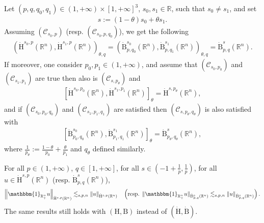 \documentclass[AHL,Unicode,longabstracts,published]{cedram}
\newcommand{\bbR}{\mathbb{R}}
\newcommand{\rmH}{\mathrm{H}}%
\newcommand{\rmB}{\mathrm{B}}
\newcommand{\clC}{\mathcal{C}}
\begin{document}
\begin{prop}\label{prop:InterpHomSpacesRn}
Let $(p,q,q_0,q_1)\in(1,+\infty)\times[1,+\infty]^3$, $s_0,s_1\in\bbR$, such that $s_0\neq s_1$, and set
\begin{align*}
s:= (1-\theta)s_0+ \theta s_1.
\end{align*}
Assuming $(\clC_{s_0,p})$ (resp. $(\clC_{s_0,p,q_0})$), we get the following
\begin{align}\label{eq:realInterpHomBspqRn}
\left(\dot{\rmH}^{s_0,p}(\bbR^n),\dot{\rmH}^{s_1,p}(\bbR^n)\right)_{\theta,q}= \left(\dot{\rmB}^{s_0}_{p,q_0}(\bbR^n),\dot{\rmB}^{s_1}_{p,q_1}(\bbR^n)\right)_{\theta,q}=\dot{\rmB}^{s}_{p,q}(\bbR^n).
\end{align}
If moreover, one consider $p_0,p_1\in(1,+\infty)$, and assume that $(\clC_{s_0,p_0})$ and $(\clC_{s_1,p_1})$ are true then also is $(\clC_{s,p_\theta})$ and
\begin{align}\label{eq:complexInterpHomHspRn}
\left[\dot{\rmH}^{s_0,p_0}(\bbR^n),\dot{\rmH}^{s_1,p_1}(\bbR^n)\right]_{\theta} = \dot{\rmH}^{s,p_\theta}(\bbR^n),
\end{align}
and if $(\clC_{s_0,p_0,q_0})$ and $(\clC_{s_1,p_1,q_1})$ are satisfied then $(\clC_{s,p_\theta,q_\theta})$ is also satisfied with
\begin{align}\label{eq:complexInterpHomBspqRn}
\left[\dot{\rmB}^{s_0}_{p_0,q_0}(\bbR^n),\dot{\rmB}^{s_1}_{p_1,q_1}(\bbR^n)\right]_{\theta} = \dot{\rmB}^{s}_{p_\theta,q_\theta}(\bbR^n),
\end{align}
where $\frac{1}{p_\theta}:=\frac{1-\theta}{p_0}+\frac{\theta}{p_1}$ and $q_\theta$ defined similarly.
\end{prop}


\begin{prop}\label{prop:SobolevMultiplier}
For all $p\in(1,+\infty)$, $q\in[1,+\infty]$, for all $s\in (-1+\frac{1}{p},\frac{1}{p})$, for all $u\in\dot{\rmH}^{s,p}(\bbR^n)$ (resp. $\dot{\rmB}^{s}_{p,q}(\bbR^{n})$),
\begin{align*}
\left\| \mathbbm{1}_{\bbR^n_+} u \right\|_{\dot{\rmH}^{s,p}(\bbR^{n})} \lesssim_{s,p,n} \| u \|_{\dot{\rmH}^{s,p}(\bbR^{n})} \quad\left(\text{resp. } \| \mathbbm{1}_{\bbR^n_+} u \|_{\dot{\rmB}^{s}_{p,q}(\bbR^{n})} \lesssim_{s,p,n} \| u \|_{\dot{\rmB}^{s}_{p,q}(\bbR^{n})}\right).
\end{align*}
The same results still holds with $({\rmH},{\rmB})$ instead of $(\dot{\rmH},\dot{\rmB})$.
\end{prop}
\end{document}
